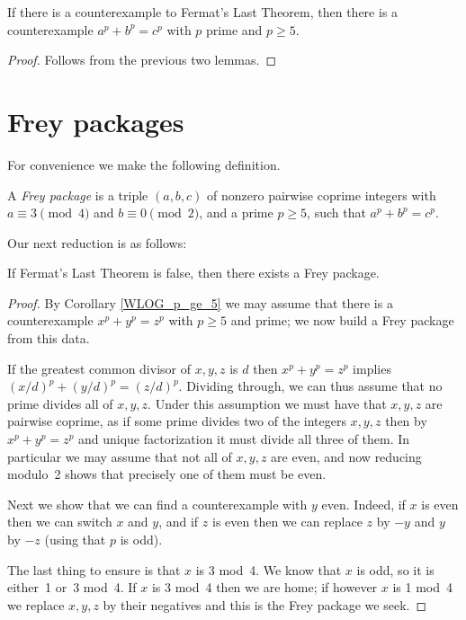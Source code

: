 \begin{corollary}\label{WLOG_p_ge_5}\leanok If there is a counterexample to Fermat's Last Theorem, then there is a counterexample $a^p+b^p=c^p$ with $p$ prime and $p\geq 5$.
\end{corollary}
\begin{proof}\leanok Follows from the previous two lemmas.\end{proof}

\section{Frey packages}

For convenience we make the following definition.

\begin{definition}\label{Frey_package}\leanok A \emph{Frey package} is a triple $(a,b,c)$ of nonzero pairwise coprime integers with $a\equiv3\pmod4$ and $b\equiv0\pmod2$, and a prime $p\geq5$, such that $a^p+b^p=c^p$.\end{definition}

Our next reduction is as follows:

\begin{lemma}\label{Frey_package_of_FLT_counterex}\leanok
  If Fermat's Last Theorem is false, then there exists a Frey package.
\end{lemma}
\begin{proof} By Corollary \ref{WLOG_p_ge_5} we may assume that there is a counterexample $x^p+y^p=z^p$ with $p\geq 5$ and prime; we now build a Frey package from this data.
  
  If the greatest common divisor of $x,y,z$ is $d$ then $x^p+y^p=z^p$ implies $(x/d)^p+(y/d)^p=(z/d)^p$. Dividing through, we can thus assume that no prime divides all of $x,y,z$. Under this assumption we must have that $x,y,z$ are pairwise coprime, as if some prime divides two of the integers $x,y,z$ then by $x^p+y^p=z^p$ and unique factorization it must divide all three of them. In particular we may assume that not all of $x,y,z$ are even, and now reducing modulo~2 shows that precisely one of them must be even. 
  
  Next we show that we can find a counterexample with $y$ even. Indeed, if $x$ is even then we can switch $x$ and $y$, and if $z$ is even then we can replace $z$ by $-y$ and $y$ by $-z$ (using that $p$ is odd).

  The last thing to ensure is that $x$ is 3 mod~4. We know that $x$ is odd, so it is either~1 or~3 mod~4. If $x$ is 3 mod~4 then we are home; if however $x$ is 1 mod~4 we replace $x,y,z$ by their negatives and this is the Frey package we seek.
\end{proof}

